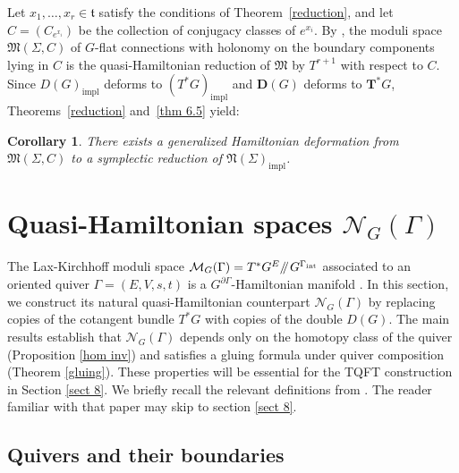 \documentclass[reqno]{amsart}
\theoremstyle{plain}
\newtheorem{Cor}[Thm]{Corollary}
\theoremstyle{definition}
\newcommand{\M}{\mathcal{M}}
\newcommand{\N}{\mathcal{N}}
\newcommand{\sll}[1]{\mkern-4mu\mathbin{/\mkern-5mu/}_{\mkern-4mu{#1}}}
\begin{document}
Let $x_1, \ldots, x_r \in \mathfrak{t}$ satisfy the conditions of Theorem~\ref{reduction}, and let $C = (C_{e^{x_i}})$ be the collection of conjugacy classes of $e^{x_i}$. By \cite[Theorem~6.3]{hurtubise2006group}, the moduli space $\mathfrak{M}(\Sigma, C)$ of $G$-flat connections with holonomy on the boundary components lying in $C$ is the quasi-Hamiltonian reduction of $\mathfrak{M}$ by $T^{r+1}$ with respect to $C$. Since $D(G)_{\mathrm{impl}}$ deforms to $(T^*G)_{\mathrm{impl}}$ and $\mathbf{D}(G)$ deforms to $\mathbf{T^*}G$, Theorems~\ref{reduction} and~\ref{thm 6.5} yield:

\begin{Cor}
There exists a generalized Hamiltonian deformation from $\mathfrak{M}(\Sigma, C)$ to a symplectic reduction of $\mathfrak{N}(\Sigma)_{\mathrm{impl}}$.
\end{Cor}


\section{Quasi-Hamiltonian spaces $\N_G(\Gamma)$}\label{sect 7}

The Lax-Kirchhoff moduli space $\M_G(\Gamma) = T^*G^E\sll{} G^{\Gamma_{\text{int}}}$ associated to an oriented quiver $\Gamma = (E,V,s,t)$ is a $G^{\partial \Gamma}$-Hamiltonian manifold \cite[]{maiza2025lax}. In this section, we construct its natural quasi-Hamiltonian counterpart $\N_G(\Gamma)$ by replacing copies of the cotangent bundle $T^*G$ with copies of the double $D(G)$. The main results establish that $\N_G(\Gamma)$ depends only on the homotopy class of the quiver (Proposition \ref{hom inv}) and satisfies a gluing formula under quiver composition (Theorem \ref{gluing}). These properties will be essential for the TQFT construction in Section \ref{sect 8}. We briefly recall the relevant definitions from \cite{maiza2025lax}. The reader familiar with that paper may skip to section \ref{sect 8}.

\subsection{Quivers and their boundaries}
\end{document}
